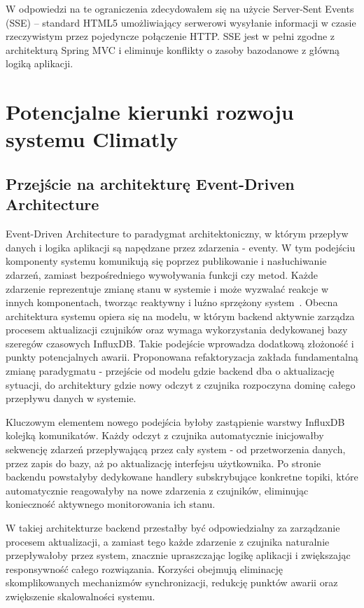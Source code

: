 \documentclass[a4paper,12pt,openany]{book}
\begin{document}
W odpowiedzi na te ograniczenia zdecydowałem się na użycie Server-Sent Events (SSE) -- standard HTML5 umożliwiający serwerowi wysyłanie informacji w czasie rzeczywistym przez pojedyncze połączenie HTTP. SSE jest w pełni zgodne z architekturą Spring MVC i eliminuje konflikty o zasoby bazodanowe z główną logiką aplikacji.

\section{Potencjalne kierunki rozwoju systemu Climatly}

\subsection*{Przejście na architekturę Event-Driven Architecture}

Event-Driven Architecture to paradygmat architektoniczny, w którym przepływ danych i logika aplikacji są napędzane przez zdarzenia - eventy. W tym podejściu komponenty systemu komunikują się poprzez publikowanie i nasłuchiwanie zdarzeń, zamiast bezpośredniego wywoływania funkcji czy metod. Każde zdarzenie reprezentuje zmianę stanu w systemie i może wyzwalać reakcje w innych komponentach, tworząc reaktywny i luźno sprzężony system~\cite{bib:boringowl2023eda}.
Obecna architektura systemu opiera się na modelu, w którym backend aktywnie zarządza procesem aktualizacji czujników oraz wymaga wykorzystania dedykowanej bazy szeregów czasowych InfluxDB. Takie podejście wprowadza dodatkową złożoność i punkty potencjalnych awarii.
Proponowana refaktoryzacja zakłada fundamentalną zmianę paradygmatu - przejście od modelu gdzie backend dba o aktualizację sytuacji, do architektury gdzie nowy odczyt z czujnika rozpoczyna dominę całego przepływu danych w systemie.

Kluczowym elementem nowego podejścia byłoby zastąpienie warstwy InfluxDB kolejką komunikatów. Każdy odczyt z czujnika automatycznie inicjowałby sekwencję zdarzeń przepływającą przez cały system - od przetworzenia danych, przez zapis do bazy, aż po aktualizację interfejsu użytkownika. Po stronie backendu powstałyby dedykowane handlery subskrybujące konkretne topiki, które automatycznie reagowałyby na nowe zdarzenia z czujników, eliminując konieczność aktywnego monitorowania ich stanu.

W takiej architekturze backend przestałby być odpowiedzialny za zarządzanie procesem aktualizacji, a zamiast tego każde zdarzenie z czujnika naturalnie przepływałoby przez system, znacznie upraszczając logikę aplikacji i zwiększając responsywność całego rozwiązania.
Korzyści obejmują eliminację skomplikowanych mechanizmów synchronizacji, redukcję punktów awarii oraz zwiększenie skalowalności systemu.
\end{document}
